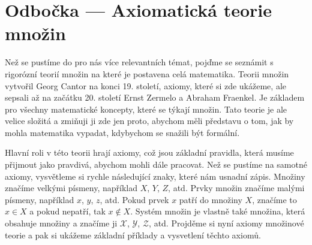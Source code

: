 
\section{Odbočka --- Axiomatická teorie množin}
Než se pustíme do pro nás více relevantních témat, pojďme se seznámit s rigorózní teorií množin na které je postavena celá matematika. Teorii množin vytvořil Georg Cantor na konci 19. století, axiomy, které si zde ukážeme, ale sepsali až na začátku 20. století Ernst Zermelo a Abraham Fraenkel. Je základem pro všechny matematické koncepty, které se týkají množin. Tato teorie je ale velice složitá a zmiňuji ji zde jen proto, abychom měli představu o tom, jak by mohla matematika vypadat, kdybychom se snažili být formální.

Hlavní roli v této teorii hrají axiomy, což jsou základní pravidla, která musíme přijmout jako pravdivá, abychom mohli dále pracovat. Než se pustíme na samotné axiomy, vysvětleme si rychle následující znaky, které nám usnadní zápis. Množiny značíme velkými písmeny, například $X$, $Y$, $Z$, atd. Prvky množin značíme malými písmeny, například $x$, $y$, $z$, atd. Pokud prvek $x$ patří do množiny $X$, značíme to $x\in X$ a pokud nepatří, tak $x\notin X$. Systém množin je vlastně také množina, která obsahuje množiny a značíme ji $\mathcal{X}$, $\mathcal{Y}$, $\mathcal{Z}$, atd. Projděme si nyní axiomy množinové teorie a pak si ukážeme základní příklady a vysvetlení těchto axiomů. 

